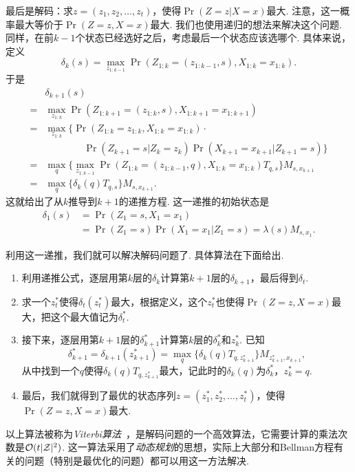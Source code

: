 最后是解码：求$z=(z_1,z_2,\dots,z_t)$，使得$\Pr(Z=z|X=x)$最大. 注意，这一概率最大等价于$\Pr(Z=z,X=x)$最大. 我们也使用递归的想法来解决这个问题. 同样，在前$k-1$个状态已经选好之后，考虑最后一个状态应该选哪个. 具体来说，定义
    \[\delta_k(s) = \max_{z_{1:k-1}}\Pr(Z_{1:k} = (z_{1:k-1}, s), X_{1:k}=x_{1:k}).\]
于是
\begin{align*}
    &\delta_{k+1}(s) \\
    =& \max_{z_{1:k}}\Pr(Z_{1:k+1} = (z_{1:k}, s), X_{1:k+1}=x_{1:k+1})\\
    =& \max_{z_{1:k}}\{\Pr(Z_{1:k} = z_{1:k}, X_{1:k}=x_{1:k})\cdot\\
    &\qquad\qquad\Pr(Z_{k+1}=s|Z_k=z_k) \Pr(X_{k+1}=x_{k+1}|Z_{k+1}=s)\}\\
    =& \max_{q}\{\max_{z_{1:k-1}}\Pr(Z_{1:k} = (z_{1:k-1},q), X_{1:k}=x_{1:k})T_{q,s}\}M_{s,x_{k+1}}\\
    =& \max_{q}\{\delta_k(q)T_{q,s}\}M_{s,x_{k+1}}.
\end{align*}
这就给出了从$k$推导到$k+1$的递推方程. 这一递推的初始状态是
\begin{align*}
    \delta_1(s) &= \Pr(Z_1=s, X_1=x_1)\\
     &= \Pr(Z_1=s)\Pr(X_1=x_1|Z_1=s) = \lambda(s)M_{s,x_1}.
\end{align*}

利用这一递推，我们就可以解决解码问题了. 具体算法在下面给出.
\begin{enumerate}
    \item 利用递推公式，逐层用第$k$层的$\delta_k$计算第$k+1$层的$\delta_{k+1}$，最后得到$\delta_t$. 
    \item 求一个$z_t^*$使得$\delta_t(z_t^*)$最大，根据定义，这个$z_t^*$也使得$\Pr(Z=z,X=x)$最大，把这个最大值记为$\delta^*_t$.
    \item 接下来，逐层用第$k+1$层的$\delta_{k+1}^*$计算第$k$层的$\delta_k^*$和$z_k^*$. 已知
    \[\delta_{k+1}^*=\delta_{k+1}(z_{k+1}^*)=\max_{q}\{\delta_k(q)T_{q,z_{k+1}^*}\}M_{z_{k+1}^*,x_{k+1}},\]
    从中找到一个$q$使得$\delta_k(q)T_{q,z_{k+1}^*}$最大，记此时的$\delta_k(q)$为$\delta_k^*$，$z_k^*=q$.
    \item 最后，我们就得到了最优的状态序列$z=(z_1^*,z_2^*,\dots,z_t^*)$，使得$\Pr(Z=z,X=x)$最大.
\end{enumerate}
以上算法被称为\textit{Viterbi算法}~\cite{viterbiErrorBoundsConvolutional1967}，是解码问题的一个高效算法，它需要计算的乘法次数是$\mathcal{O}(t|\mathcal Z|^2)$. 这一算法采用了\textit{动态规划}的思想，实际上大部分和Bellman方程有关的问题（特别是最优化的问题）都可以用这一方法解决.

